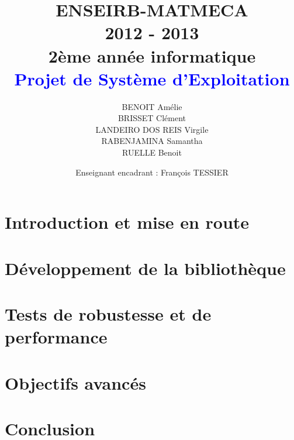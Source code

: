 \documentclass[a4paper,12pt]{article}
\title{
	\normalsize{ENSEIRB-MATMECA \\ 
	2012 - 2013 \\
	2ème année informatique} \\
	\vspace{15mm}
	\Huge{\textcolor{blue}{Projet de Système d'Exploitation }}
}
\author{ BENOIT Amélie \\ BRISSET Clément \\ LANDEIRO DOS REIS Virgile \\ RABENJAMINA Samantha \\ RUELLE Benoit}
\date{
	\normalsize{Enseignant encadrant : François TESSIER}
}
\begin{document}
\maketitle

\clearpage

\section{Introduction et mise en route}


\section{Développement de la bibliothèque}


\section{Tests de robustesse et de performance}


\section{Objectifs avancés}


\section{Conclusion}

\end{document}
